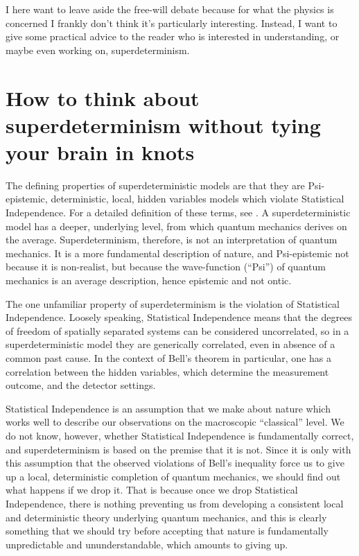 \documentclass[12pt,A4]{article}
\begin{document}
I here want to leave aside the free-will debate because for what the physics is concerned I frankly don't think it's particularly interesting. Instead, I want to give some practical advice to the reader who is interested in understanding, or maybe
even working on, superdeterminism. 

\section{How to think about superdeterminism without tying your brain in knots}
\label{knots}

The defining properties of superdeterministic models are that they are Psi-epistemic, deterministic, local, hidden variables models which
violate Statistical Independence. For a detailed definition of these terms, see \cite{Hossenfelder:2019shy}. A superdeterministic
model has a deeper, underlying level, from which quantum mechanics derives on the average. Superdeterminism, therefore,
is not an interpretation of quantum mechanics. It is a more fundamental description of nature, and Psi-epistemic not
because it is non-realist, but because the wave-function (``Psi'') of quantum mechanics is an average description, hence epistemic and not ontic. 


The one unfamiliar property of superdeterminism is the violation of Statistical Independence. Loosely speaking, Statistical
Independence means that the degrees of freedom of spatially separated systems can be considered uncorrelated,
so in a superdeterministic model they are generically correlated, even in absence of a common past cause. 
In the context of Bell's theorem \cite{Bell} in particular, one
has a correlation between the hidden variables, which determine the measurement outcome, and the detector settings. 

Statistical Independence is an assumption that we make about nature which works well to describe our observations on the
macroscopic ``classical'' level. We do not know, however, whether Statistical Independence is fundamentally correct,
and superdeterminism is based on the premise that it is not. 
Since it is only with this assumption that the observed violations of Bell's inequality force us to give up a local,
deterministic completion of quantum mechanics, we should find out what happens if we drop it. That is because
once we
drop Statistical Independence, there is nothing preventing us from developing a consistent local and deterministic theory
underlying quantum mechanics, and this is clearly something that we should try before accepting that nature
is fundamentally unpredictable and ununderstandable, which amounts to giving up. 
\end{document}

